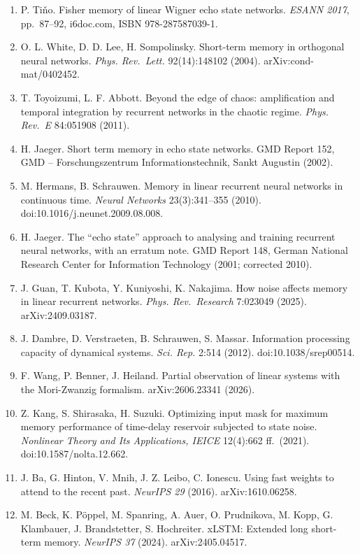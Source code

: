 \documentclass[
  10pt,
]{article}
\begin{document}
\begin{enumerate}
  (release v1.0).
\item
  P. Tiňo. Fisher memory of linear Wigner echo state networks.
  \emph{ESANN 2017}, pp.~87--92, i6doc.com, ISBN 978-287587039-1.
\item
  O. L. White, D. D. Lee, H. Sompolinsky. Short-term memory in
  orthogonal neural networks. \emph{Phys. Rev.~Lett.} 92(14):148102
  (2004). arXiv:cond-mat/0402452.
\item
  T. Toyoizumi, L. F. Abbott. Beyond the edge of chaos: amplification
  and temporal integration by recurrent networks in the chaotic regime.
  \emph{Phys. Rev.~E} 84:051908 (2011).
\item
  H. Jaeger. Short term memory in echo state networks. GMD Report 152,
  GMD -- Forschungszentrum Informationstechnik, Sankt Augustin (2002).
\item
  M. Hermans, B. Schrauwen. Memory in linear recurrent neural networks
  in continuous time. \emph{Neural Networks} 23(3):341--355 (2010).
  doi:10.1016/j.neunet.2009.08.008.
\item
  H. Jaeger. The ``echo state'' approach to analysing and training
  recurrent neural networks, with an erratum note. GMD Report 148,
  German National Research Center for Information Technology (2001;
  corrected 2010).
\item
  J. Guan, T. Kubota, Y. Kuniyoshi, K. Nakajima. How noise affects
  memory in linear recurrent networks. \emph{Phys. Rev.~Research}
  7:023049 (2025). arXiv:2409.03187.
\item
  J. Dambre, D. Verstraeten, B. Schrauwen, S. Massar. Information
  processing capacity of dynamical systems. \emph{Sci. Rep.} 2:514
  (2012). doi:10.1038/srep00514.
\item
  F. Wang, P. Benner, J. Heiland. Partial observation of linear systems
  with the Mori-Zwanzig formalism. arXiv:2606.23341 (2026).
\item
  Z. Kang, S. Shirasaka, H. Suzuki. Optimizing input mask for maximum
  memory performance of time-delay reservoir subjected to state noise.
  \emph{Nonlinear Theory and Its Applications, IEICE} 12(4):662
  ff.~(2021). doi:10.1587/nolta.12.662.
\item
  J. Ba, G. Hinton, V. Mnih, J. Z. Leibo, C. Ionescu. Using fast weights
  to attend to the recent past. \emph{NeurIPS 29} (2016).
  arXiv:1610.06258.
\item
  M. Beck, K. Pöppel, M. Spanring, A. Auer, O. Prudnikova, M. Kopp, G.
  Klambauer, J. Brandstetter, S. Hochreiter. xLSTM: Extended long
  short-term memory. \emph{NeurIPS 37} (2024). arXiv:2405.04517.

\end{enumerate}
\end{document}
